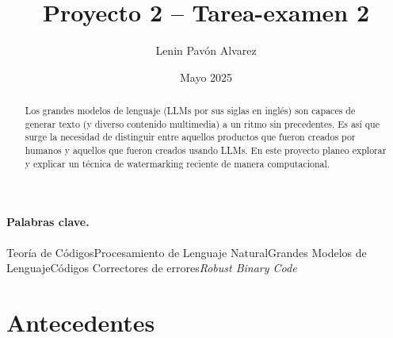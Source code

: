 \documentclass[a4paper,11pt]{article}
\title{Proyecto 2 -- Tarea-examen 2}
\author{
Lenin Pavón Alvarez
}
\date{Mayo 2025}
\begin{document}
\maketitle
\begin{abstract}
    Los grandes modelos de lenguaje (LLMs por sus siglas en inglés) son capaces de generar texto (y diverso contenido multimedia) a un ritmo sin precedentes. Es así que surge la necesidad de distinguir entre aquellos productos que fueron creados por humanos y aquellos que fueron creados usando LLMs. En este proyecto planeo explorar y explicar un técnica de watermarking reciente \cite{chao_watermarking_2025} de manera computacional.
\end{abstract}
\paragraph{Palabras clave.} Teoría de Códigos\quad Procesamiento de Lenguaje Natural\quad Grandes Modelos de Lenguaje\quad Códigos Correctores de errores\quad \textit{Robust Binary Code}
\tableofcontents
\section{Antecedentes}
\end{document}
